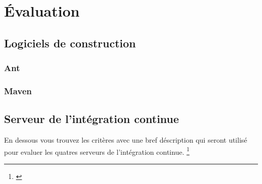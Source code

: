 \chapter{Évaluation}
\label{eval}

\section{Logiciels de construction}

\subsection{Ant}

\subsection{Maven}

\section{Serveur de l'intégration continue}

En dessous vous trouvez les critères avec une bref déscription qui seront utilisé pour evaluer les quatres serveurs de l'intégration continue. \footnote{\cite{ibmciserver}}


